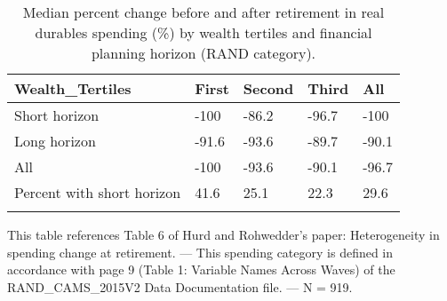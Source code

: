 \begin{table}[tbp] \centering
{}

\caption{Median percent change before and after retirement in real durables spending (\%) by wealth tertiles and financial planning horizon (RAND category).}
\begin{tabularx}{\textwidth}{lCCCC}

\toprule
{Wealth\_Tertiles}&{First}&{Second}&{Third}&{All} \tabularnewline
\midrule\addlinespace[1.5ex]
Short horizon&-100&-86.2&-96.7&-100 \tabularnewline
Long horizon&-91.6&-93.6&-89.7&-90.1 \tabularnewline
All&-100&-93.6&-90.1&-96.7 \tabularnewline
Percent with short horizon&41.6&25.1&22.3&29.6 \tabularnewline
\bottomrule \addlinespace[1.5ex]

\end{tabularx}
\begin{flushleft}
\footnotesize This table references Table 6 of Hurd and Rohwedder's paper: Heterogeneity in spending change at retirement. \linebreak --- \linebreak This spending category is defined in accordance with page 9 (Table 1: Variable Names Across Waves) of the RAND\_CAMS\_2015V2 Data Documentation file. \linebreak --- \linebreak N = 919.
\end{flushleft}
\end{table}
